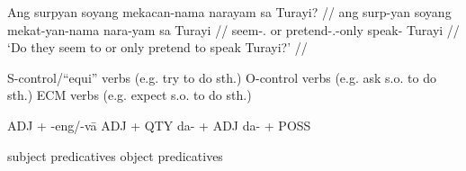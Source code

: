 \documentclass[12pt,a4paper]{scrartcl}
\newcommand{\TplM}{{\Tpl}.{\M}}
\begin{document}
\gla Ang surpyan soyang mekacan-nama narayam sa Turayi? //
\glb ang surp-yan soyang mekat-yan-nama nara-yam sa Turayi //
\glc \AgtT{} seem-\TplM{} or pretend-\TplM{}-only speak-\Ptcp{} \Parg{} Turayi //
\glft `Do they seem to or only pretend to speak Turayi?' //
\endgl\xe

\ex S-control/``equi'' verbs (e.g. try to do sth.) \xe
\ex O-control verbs (e.g. ask s.o. to do sth.) \xe
\ex ECM verbs (e.g. expect s.o. to do sth.) \xe

\ex ADJ + -eng/-vā \xe
\ex ADJ + QTY \xe
\ex da- + ADJ \xe
\ex da- + POSS \xe

\ex subject predicatives \xe
\ex object predicatives \xe

\vfill

\begin{multicols}{2}
\printglossary[style=mysuper,type=\leipzigtype]
\end{multicols}
\end{document}
